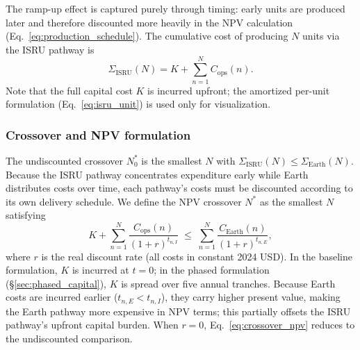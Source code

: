 \documentclass[preprint,12pt]{elsarticle}
\begin{document}
The ramp-up effect is captured purely through timing: early units are produced later and therefore discounted more heavily in the NPV calculation (Eq.~\ref{eq:production_schedule}). The cumulative cost of producing $N$ units via the ISRU pathway is
\begin{equation}
  \Sigma_{\mathrm{ISRU}}(N) = K + \sum_{n=1}^{N} C_{\mathrm{ops}}(n).
  \label{eq:isru_cum}
\end{equation}
Note that the full capital cost $K$ is incurred upfront; the amortized per-unit formulation (Eq.~\ref{eq:isru_unit}) is used only for visualization.

\subsubsection{Crossover and NPV formulation}

The undiscounted crossover $N^*_0$ is the smallest $N$ with $\Sigma_{\mathrm{ISRU}}(N) \leq \Sigma_{\mathrm{Earth}}(N)$. Because the ISRU pathway concentrates expenditure early while Earth distributes costs over time, each pathway's costs must be discounted according to its own delivery schedule. We define the NPV crossover $N^*$ as the smallest $N$ satisfying
\begin{equation}
  K + \sum_{n=1}^{N} \frac{C_{\mathrm{ops}}(n)}{(1+r)^{t_{n,I}}} \;\leq\; \sum_{n=1}^{N} \frac{C_{\mathrm{Earth}}(n)}{(1+r)^{t_{n,E}}},
  \label{eq:crossover_npv}
\end{equation}
where $r$ is the real discount rate (all costs in constant 2024 USD). In the baseline formulation, $K$ is incurred at $t = 0$; in the phased formulation (\S\ref{sec:phased_capital}), $K$ is spread over five annual tranches. Because Earth costs are incurred earlier ($t_{n,E} < t_{n,I}$), they carry higher present value, making the Earth pathway more expensive in NPV terms; this partially offsets the ISRU pathway's upfront capital burden. When $r = 0$, Eq.~\ref{eq:crossover_npv} reduces to the undiscounted comparison.
\end{document}
